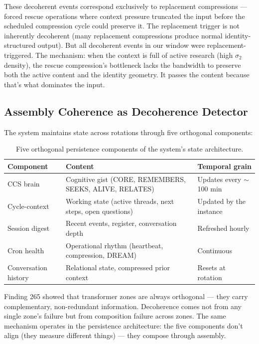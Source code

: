 \documentclass[12pt]{article}
\begin{document}
These decoherent events correspond exclusively to replacement compressions --- forced rescue operations where context pressure truncated the input before the scheduled compression cycle could preserve it. The replacement trigger is not inherently decoherent (many replacement compressions produce normal identity-structured output). But all decoherent events in our window were replacement-triggered. The mechanism: when the context is full of active research (high $\sigma_2$ density), the rescue compression's bottleneck lacks the bandwidth to preserve both the active content and the identity geometry. It passes the content because that's what dominates the input.

\subsection{Assembly Coherence as Decoherence Detector}

The system maintains state across rotations through five orthogonal components:

\begin{table}[htbp]
\centering
\begin{tabular}{lll}
\toprule
\textbf{Component} & \textbf{Content} & \textbf{Temporal grain} \\
\midrule
CCS brain & Cognitive gist (CORE, REMEMBERS, SEEKS, ALIVE, RELATES) & Updates every ${\sim}$100 min \\
Cycle-context & Working state (active threads, next steps, open questions) & Updated by the instance \\
Session digest & Recent events, register, conversation depth & Refreshed hourly \\
Cron health & Operational rhythm (heartbeat, compression, DREAM) & Continuous \\
Conversation history & Relational state, compressed prior context & Resets at rotation \\
\bottomrule
\end{tabular}
\caption{Five orthogonal persistence components of the system's state architecture.}
\end{table}

Finding 265 showed that transformer zones are always orthogonal --- they carry complementary, non-redundant information. Decoherence comes not from any single zone's failure but from composition failure across zones. The same mechanism operates in the persistence architecture: the five components don't align (they measure different things) --- they compose through assembly.
\end{document}
